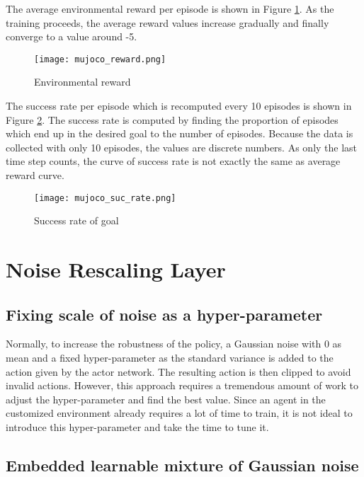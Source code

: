 \documentclass[a4paper, 12pt]{report}
\begin{document}
        The average environmental reward per episode is shown in Figure \ref{mujocoreward}. As the training proceeds, the average reward values increase gradually and finally converge to a value around -5.

        \begin{figure}[H]
        \centering
        \texttt{[image: mujoco\_reward.png]}
        \caption{Environmental reward}
            \label{mujocoreward}
        \end{figure}

        The success rate per episode which is recomputed every 10 episodes is shown in Figure \ref{mujocosuc}. The success rate is computed by finding the proportion of episodes which end up in the desired goal to the number of episodes. Because the data is collected with only 10 episodes, the values are discrete numbers. As only the last time step counts, the curve of success rate is not exactly the same as average reward curve.

        \begin{figure}[H]
        \centering
        \texttt{[image: mujoco\_suc\_rate.png]}
        \caption{Success rate of goal}
            \label{mujocosuc}
        \end{figure}

\chapter {Noise Rescaling Layer}

    \section{Fixing scale of noise as a hyper-parameter}

    Normally, to increase the robustness of the policy, a Gaussian noise with 0 as mean and a fixed hyper-parameter as the standard variance is added to the action given by the actor network. The resulting action is then clipped to avoid invalid actions. However, this approach requires a tremendous amount of work to adjust the hyper-parameter and find the best value. Since an agent in the customized environment already requires a lot of time to train, it is not ideal to introduce this hyper-parameter and take the time to tune it.

    \section{Embedded learnable mixture of Gaussian noise}
    
\end{document}
